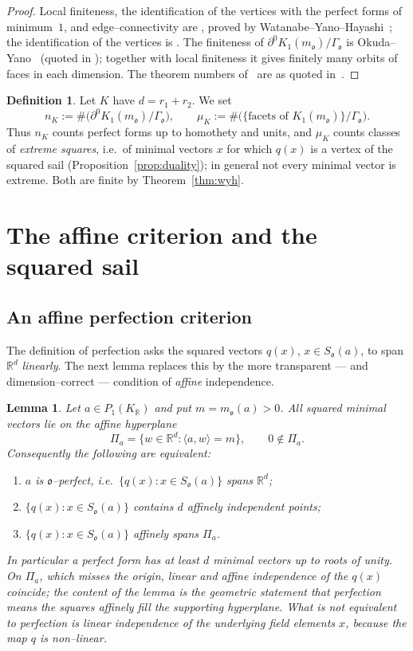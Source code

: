 \documentclass[11pt,reqno]{amsart}
\theoremstyle{plain}
\newtheorem{lemma}[theorem]{Lemma}
\theoremstyle{definition}
\newtheorem{definition}[theorem]{Definition}
\newcommand{\R}{\mathbb{R}}
\newcommand{\Ok}{\mathfrak{o}}
\newcommand{\bdy}{\partial}
\newcommand{\nK}{n_K}
\newcommand{\muK}{\mu_K}
\begin{document}
\begin{proof}
Local finiteness, the identification of the vertices with the perfect forms of minimum~$1$, and
edge--connectivity are \cite[Thm.~2.2]{KW}, proved by Watanabe--Yano--Hayashi~\cite{WYH}; the
identification of the vertices is \cite[Thm.~2.4]{WYH}. The finiteness of $\bdy^0K_1(m_\Ok)/\Gamma_\Ok$ is
Okuda--Yano~\cite[Thm.~5.1]{OY} (quoted in \cite[\S1]{KW}); together with local finiteness it gives
finitely many orbits of faces in each dimension. The theorem numbers of~\cite{WYH,OY} are as quoted
in~\cite{KW}.
\end{proof}

\begin{definition}\label{def:counts}
Let $K$ have $d=r_1+r_2$. We set
\[
\nK:=\#\big(\bdy^0K_1(m_\Ok)/\Gamma_\Ok\big),\qquad
\muK:=\#\big(\{\text{facets of }K_1(m_\Ok)\}/\Gamma_\Ok\big).
\]
Thus $\nK$ counts perfect forms up to homothety and units, and $\muK$ counts classes of \emph{extreme
squares}, i.e.\ of minimal vectors $x$ for which $q(x)$ is a vertex of the squared sail
(Proposition~\ref{prop:duality}); in general not every minimal vector is extreme. Both are finite by Theorem~\ref{thm:wyh}.
\end{definition}

\section{The affine criterion and the squared sail}

\subsection{An affine perfection criterion}
The definition of perfection asks the squared vectors $q(x)$, $x\in S_\Ok(a)$, to span $\R^d$
\emph{linearly}. The next lemma replaces this by the more transparent --- and dimension--correct ---
condition of \emph{affine} independence.

\begin{lemma}\label{lem:affine}
Let $a\in P_1(K_\R)$ and put $m=m_\Ok(a)>0$. All squared minimal vectors lie on the affine hyperplane
\[
\Pi_a=\{w\in\R^d:\langle a,w\rangle=m\},\qquad 0\notin\Pi_a .
\]
Consequently the following are equivalent:
\begin{enumerate}[label=\textup{(\roman*)},leftmargin=2.2em]
\item $a$ is $\Ok$--perfect, i.e.\ $\{q(x):x\in S_\Ok(a)\}$ spans $\R^d$;
\item $\{q(x):x\in S_\Ok(a)\}$ contains $d$ affinely independent points;
\item $\{q(x):x\in S_\Ok(a)\}$ affinely spans $\Pi_a$.
\end{enumerate}
In particular a perfect form has at least $d$ minimal vectors up to roots of unity. On $\Pi_a$, which
misses the origin, linear and affine independence of the $q(x)$ \emph{coincide}; the content of the lemma
is the geometric statement that perfection means the squares affinely fill the supporting hyperplane. What
is \emph{not} equivalent to perfection is linear independence of the underlying field elements $x$, because
the map $q$ is non--linear.
\end{lemma}
\end{document}
